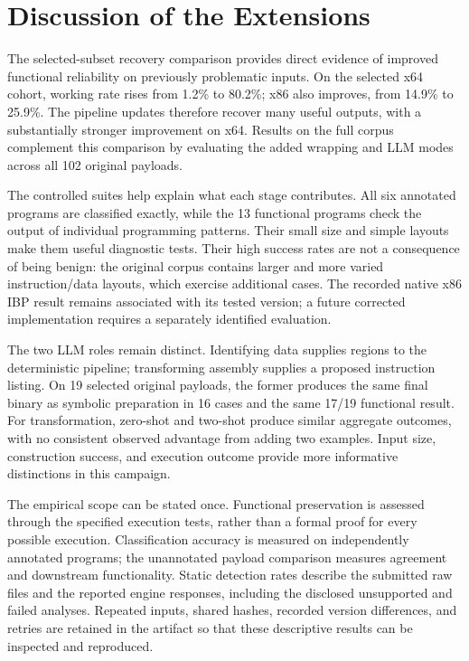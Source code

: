 \section{Discussion of the Extensions}\label{sec:extension_limits}
The selected-subset recovery comparison provides direct evidence of improved functional
reliability on previously problematic inputs. On the selected x64 cohort,
working rate rises from 1.2\% to 80.2\%; x86 also improves, from 14.9\%
to 25.9\%. The pipeline updates therefore recover many useful outputs,
with a substantially stronger improvement on x64. Results on the full
corpus complement this comparison by evaluating the added wrapping and
LLM modes across all 102 original payloads.

The controlled suites help explain what each stage contributes. All six
annotated programs are classified exactly, while the 13 functional
programs check the output of individual programming patterns. Their small
size and simple layouts make them useful diagnostic tests. Their high
success rates are not a consequence of being benign: the original corpus
contains larger and more varied instruction/data layouts, which exercise
additional cases. The recorded native x86 IBP result remains associated with its tested
version; a future corrected implementation requires a separately identified
evaluation.

The two LLM roles remain distinct. Identifying data supplies regions to
the deterministic pipeline; transforming assembly supplies a proposed
instruction listing. On 19 selected original payloads, the former
produces the same final binary as symbolic preparation in 16 cases and
the same 17/19 functional result. For transformation, zero-shot and two-shot
produce similar aggregate outcomes, with no consistent observed advantage
from adding two examples. Input size, construction success, and execution
outcome provide more informative distinctions in this campaign.

The empirical scope can be stated once. Functional preservation is assessed
through the specified execution tests, rather than a formal proof for every
possible execution. Classification accuracy is measured on independently
annotated programs; the unannotated payload comparison measures agreement
and downstream functionality. Static detection rates describe the submitted
raw files and the reported engine responses, including the disclosed
unsupported and failed analyses. Repeated inputs, shared hashes, recorded
version differences, and retries are retained in the artifact so that these
descriptive results can be inspected and reproduced.
